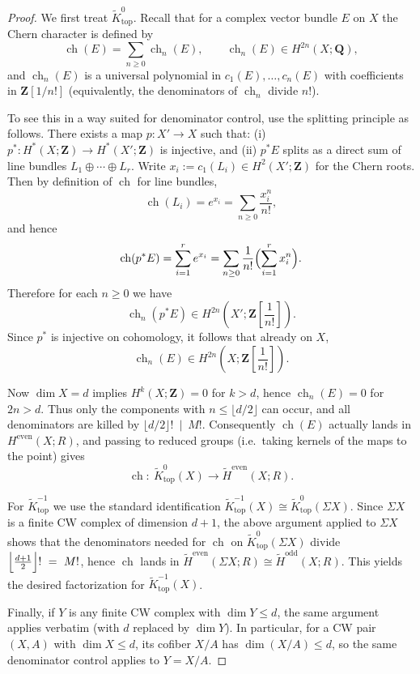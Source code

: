 \documentclass[11pt]{amsart}
\numberwithin{equation}{section}
\newcommand{\ch}{{\operatorname{ch}}}
\newcommand{\topp}{{\operatorname{top}}}
\numberwithin{equation}{section}
\begin{document}
\begin{proof}
We first treat $\widetilde{K}_{\topp}^0$.
Recall that for a complex vector bundle $E$ on $X$ the Chern character is defined by
\[
\ch(E)=\sum_{n\ge 0}\ch_n(E),\qquad \ch_n(E)\in H^{2n}(X;\mathbf{Q}),
\]
and $\ch_n(E)$ is a universal polynomial in $c_1(E),\dots,c_n(E)$ with coefficients in $\mathbf{Z}[1/n!]$
(equivalently, the denominators of $\ch_n$ divide $n!$).

To see this in a way suited for denominator control, use the splitting principle as follows.
There exists a map $p\colon X'\to X$ such that:
(i) $p^*\colon H^*(X;\mathbf{Z})\to H^*(X';\mathbf{Z})$ is injective, and
(ii) $p^*E$ splits as a direct sum of line bundles $L_1\oplus\cdots\oplus L_r$.
Write $x_i:=c_1(L_i)\in H^2(X';\mathbf{Z})$ for the Chern roots. Then by definition of $\ch$ for line bundles,
\[
\ch(L_i)=e^{x_i}=\sum_{n\ge 0}\frac{x_i^n}{n!},
\]
and hence
\[
\ch(p^*E)=\sum_{i=1}^r e^{x_i}
=\sum_{n\ge 0}\frac{1}{n!}\Bigl(\sum_{i=1}^r x_i^n\Bigr).
\]
Therefore for each $n\ge 0$ we have
\[
\ch_n(p^*E)\in H^{2n}\!\left(X';\mathbf{Z}\!\left[\frac{1}{n!}\right]\right).
\]
Since $p^*$ is injective on cohomology, it follows that already on $X$,
\[
\ch_n(E)\in H^{2n}\!\left(X;\mathbf{Z}\!\left[\frac{1}{n!}\right]\right).
\]

Now $\dim X=d$ implies $H^{k}(X;\mathbf{Z})=0$ for $k>d$, hence $\ch_n(E)=0$ for $2n>d$.
Thus only the components with $n\le \lfloor d/2\rfloor$ can occur, and all denominators are killed by $\bigl\lfloor d/2\bigr\rfloor!\ \mid\ M!$. Consequently $\ch(E)$ actually lands in $H^{\mathrm{even}}(X;R)$, and passing to reduced groups
(i.e.\ taking kernels of the maps to the point) gives
\[
\ch:\ \widetilde{K}_{\topp}^0(X)\longrightarrow \widetilde H^{\mathrm{even}}(X;R).
\]

For $\widetilde{K}_{\topp}^{-1}$ we use the standard identification $\widetilde{K}_{\topp}^{-1}(X)\cong \widetilde{K}_{\topp}^0(\Sigma X)$.
Since $\Sigma X$ is a finite CW complex of dimension $d+1$, the above argument applied to $\Sigma X$ shows
that the denominators needed for $\ch$ on $\widetilde{K}_{\topp}^0(\Sigma X)$ divide $
\Bigl\lfloor\frac{d+1}{2}\Bigr\rfloor! \ =\ M!$, hence $\ch$ lands in $\widetilde H^{\mathrm{even}}(\Sigma X;R)\cong \widetilde H^{\mathrm{odd}}(X;R)$.
This yields the desired factorization for $\widetilde{K}_{\topp}^{-1}(X)$.

Finally, if $Y$ is any finite CW complex with $\dim Y\le d$, the same argument applies verbatim (with $d$ replaced by
$\dim Y$). In particular, for a CW pair $(X,A)$ with $\dim X\le d$, its cofiber $X/A$ has $\dim(X/A)\le d$,
so the same denominator control applies to $Y=X/A$.
\end{proof}
\end{document}
